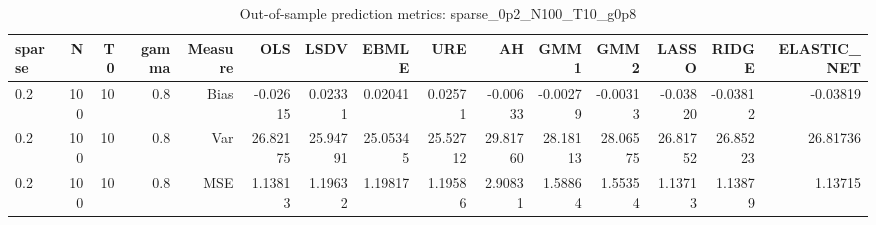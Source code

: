 \begin{table}[!htbp]\centering
\caption{Out-of-sample prediction metrics: sparse_0p2_N100_T10_g0p8}
\label{tab:table3_sparse_0p2_N100_T10_g0p8}
\begin{tabular}{lrrrrrrrrrrrrrr}
\hline
sparse & N & T0 & gamma & Measure & OLS & LSDV & EBMLE & URE & AH & GMM1 & GMM2 & LASSO & RIDGE & ELASTIC_NET \\
\hline
0.2 & 100 & 10 & 0.8 & Bias & -0.02615 & 0.02331 & 0.02041 & 0.02571 & -0.00633 & -0.00279 & -0.00313 & -0.03820 & -0.03812 & -0.03819 \\
0.2 & 100 & 10 & 0.8 & Var & 26.82175 & 25.94791 & 25.05345 & 25.52712 & 29.81760 & 28.18113 & 28.06575 & 26.81752 & 26.85223 & 26.81736 \\
0.2 & 100 & 10 & 0.8 & MSE & 1.13813 & 1.19632 & 1.19817 & 1.19586 & 2.90831 & 1.58864 & 1.55354 & 1.13713 & 1.13879 & 1.13715 \\
\hline
\end{tabular}
\end{table}

